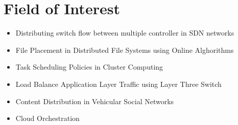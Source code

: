 \documentclass[a4paper,10pt]{article} %
\begin{document}
\color{blue}
\section{Field of Interest}
\color{Black}
\begin{itemize}
	\item Distributing switch flow between multiple controller in SDN networks
	\item File Placement in Distributed File Systems using Online Alghorithms
	\item Task Scheduling Policies in Cluster Computing
	\item Load Balance Application Layer Traffic using Layer Three Switch 
	\item Content Distribution in Vehicular Social Networks
	\item Cloud Orchestration
					
	
		
	\end{itemize}
\end{document}
